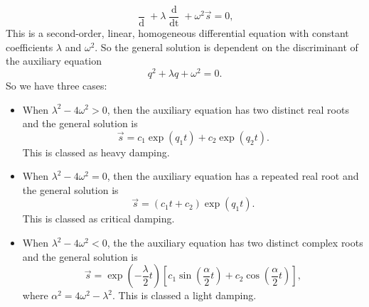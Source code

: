 \begin{equation}
    \frac{\mathop{\mathrm{d}^2\vec{s}}}{\mathop{\mathrm{d}t^2}} + \lambda \frac{\mathop{\mathrm{d}\vec{s}}}{\mathop{\mathrm{d}t} }+ \omega^2 \vec{s} = 0,
\end{equation}
This is a second-order, linear, homogeneous differential equation with constant coefficients $\lambda$ and $\omega^2$. So the general solution is dependent on the discriminant of the auxiliary equation
\begin{equation}
    q^2 + \lambda q + \omega^2 = 0.
\end{equation}
So we have three cases:
\begin{itemize}
    \item When $\lambda^2 - 4 \omega^2 > 0$, then the auxiliary equation has two distinct real roots and the general solution is 
    \begin{equation}
        \vec{s} = c_1 \exp(q_1 t) + c_2 \exp(q_2 t).
    \end{equation}
    This is classed as heavy damping.
    \item When $\lambda^2 - 4 \omega^2 = 0$, then the auxiliary equation has a repeated real root and the general solution is
    \begin{equation}
        \vec{s} = (c_1 t + c_2) \exp(q_1 t).
    \end{equation}
    This is classed as critical damping. 
    \item When $\lambda^2 - 4 \omega^2 < 0$, the the auxiliary equation has two distinct complex roots and the general solution is
    \begin{equation}
        \vec{s} = \exp\left(-\frac{\lambda}{2}t\right) \left[c_1 \sin \left(\frac{\alpha}{2}t\right) + c_2 \cos \left(\frac{\alpha}{2}t\right)\right]   ,
    \end{equation}
    where $\alpha^2 = 4 \omega^2 - \lambda^2$. This is classed a light damping.
\end{itemize}

\begin{figure}[h!]
    \centering
\end{figure}
\FloatBarrier

